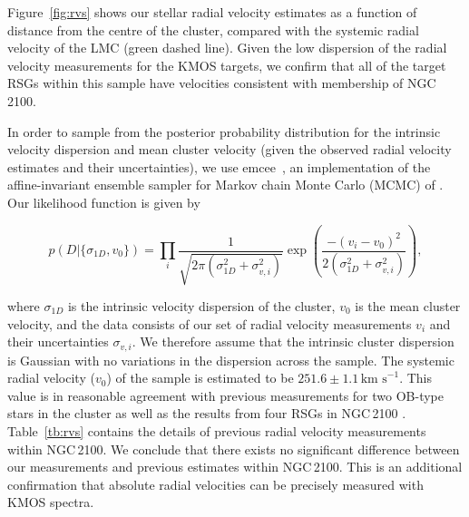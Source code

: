 \documentclass[useAMS,usenatbib]{mn2e}
\def\kms{$\mbox{km s}^{-1}$}
\begin{document}

Figure~\ref{fig:rvs} shows our stellar radial velocity estimates as a function of distance from the centre of the cluster, compared with the systemic radial velocity of the LMC (green dashed line).
Given the low dispersion of the radial velocity measurements for the KMOS targets, we confirm that all of the target RSGs within this sample have velocities consistent with membership of NGC\,2100.

In order to sample from the posterior probability distribution for the intrinsic velocity dispersion and mean cluster velocity (given the observed radial velocity estimates and their uncertainties), we use emcee~\citep{2013PASP..125..306F},
an implementation of the affine-invariant ensemble sampler for Markov chain Monte Carlo (MCMC) of \cite{2010CAMCS.5..65G}. Our likelihood function is given by

\begin{equation}
p(D|\{\sigma_{1D}, v_0\}) = \prod_i \frac{1}{\sqrt{2 \pi (\sigma_{1D}^2+ \sigma_{v, i}^2)}}  \exp{\left(\frac{-(v_i - v_0)^2}{2 (\sigma_{1D}^2+ \sigma_{v, i}^2)}\right)},
\label{eq:like}
\end{equation}

\noindent where $\sigma_{1D}$ is the intrinsic velocity dispersion of the cluster, $v_0$ is the mean cluster velocity, and the data consists of our set of radial velocity measurements $v_i$ and their uncertainties $\sigma_{v, i}$. We therefore assume that the intrinsic cluster dispersion is Gaussian with no variations in the dispersion across the sample.
The systemic radial velocity ($v_0$) of the sample is estimated to be $251.6\pm1.1$\,\kms.
This value is in reasonable agreement with previous measurements for two OB-type stars in the cluster
\citep{2015A&A...584A...5E} as well as the results from four RSGs in NGC\,2100
\citep[henceforth JT94; three of which were observed in the current study]{1994A&A...282..717J}.
Table~\ref{tb:rvs} contains the details of previous radial velocity measurements within NGC\,2100.
We conclude that there exists no significant difference between our measurements and previous estimates within NGC\,2100.
This is an additional confirmation that absolute radial velocities can be precisely measured with KMOS spectra.
\end{document}
